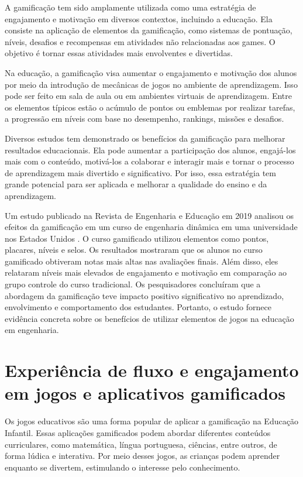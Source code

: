 A gamificação tem sido amplamente utilizada como uma estratégia de engajamento e motivação em diversos contextos, incluindo a educação. Ela consiste na aplicação de elementos da gamificação, como sistemas de pontuação, níveis, desafios e recompensas em atividades não relacionadas aos games. O objetivo é tornar essas atividades mais envolventes e divertidas. 

Na educação, a gamificação visa aumentar o engajamento e motivação dos alunos por meio da introdução de mecânicas de jogos no ambiente de aprendizagem. Isso pode ser feito em sala de aula ou em ambientes virtuais de aprendizagem. Entre os elementos típicos estão o acúmulo de pontos ou emblemas por realizar tarefas, a progressão em níveis com base no desempenho, rankings, missões e desafios.

Diversos estudos tem demonstrado os benefícios da gamificação para melhorar resultados educacionais. Ela pode aumentar a participação dos alunos, engajá-los mais com o conteúdo, motivá-los a colaborar e interagir mais e tornar o processo de aprendizagem mais divertido e significativo. Por isso, essa estratégia tem grande potencial para ser aplicada e melhorar a qualidade do ensino e da aprendizagem.


Um estudo publicado na Revista de Engenharia e Educação em 2019 analisou os efeitos da gamificação em um curso de engenharia dinâmica em uma universidade nos Estados Unidos \cite{subhash2018gamification}. O curso gamificado utilizou elementos como pontos, placares, níveis e selos. Os resultados mostraram que os alunos no curso gamificado obtiveram notas mais altas nas avaliações finais. Além disso, eles relataram níveis mais elevados de engajamento e motivação em comparação ao grupo controle do curso tradicional. Os pesquisadores concluíram que a abordagem da gamificação teve impacto positivo significativo no aprendizado, envolvimento e comportamento dos estudantes. Portanto, o estudo fornece evidência concreta sobre os benefícios de utilizar elementos de jogos na educação em engenharia.

\section{Experiência de fluxo e engajamento em jogos e aplicativos gamificados}

Os jogos educativos são uma forma popular de aplicar a gamificação na Educação Infantil. Essas aplicações gamificados podem abordar diferentes conteúdos curriculares, como matemática, língua portuguesa, ciências, entre outros, de forma lúdica e interativa. Por meio desses jogos, as crianças podem aprender enquanto se divertem, estimulando o interesse pelo conhecimento.

